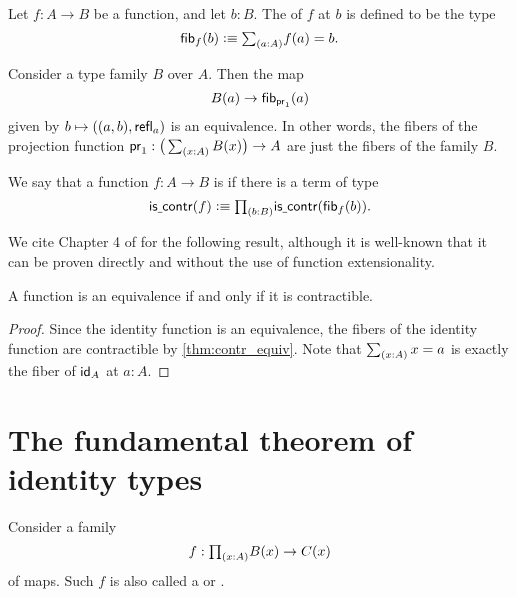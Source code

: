 \begin{defn}
Let $f:A\to B$ be a function, and let $b:B$. The  of $f$ at $b$ is defined to be the type
\begin{equation*}
\fib{f}{b}\defeq\sm{a:A}f(a)=b.
\end{equation*}
\end{defn}

\begin{eg}\label{eg:fib_proj}
Consider a type family $B$ over $A$. Then the map
\begin{equation*}
B(a)\to \fib{\proj 1}{a}
\end{equation*}
given by $b\mapsto ((a,b),\refl{a})$ is an equivalence. In other words, the fibers of the projection function $\proj 1 : \big(\sm{x:A}B(x)\big)\to A$ are just the fibers of the family $B$.
\end{eg}

\begin{defn}
We say that a function $f:A\to B$ is  if there is a term of type
\begin{equation*}
\iscontr(f)\defeq\prd{b:B}\iscontr(\fib{f}{b}).
\end{equation*}
\end{defn}

We cite Chapter 4 of \cite{hottbook} for the following result, although it is well-known that it can be proven directly and without the use of function extensionality.

\begin{prp}\label{thm:contr_equiv}
A function is an equivalence if and only if it is contractible.
\end{prp}

\begin{proof}
Since the identity function is an equivalence, the fibers of the identity function are contractible by \autoref{thm:contr_equiv}. Note that $\sm{x:A}x=a$ is exactly the fiber of $\idfunc[A]$ at $a:A$.
\end{proof}

\section{The fundamental theorem of identity types}
Consider a family
\begin{equation*}
f : \prd{x:A}B(x)\to C(x)
\end{equation*}
of maps. Such $f$ is also called a  or .

